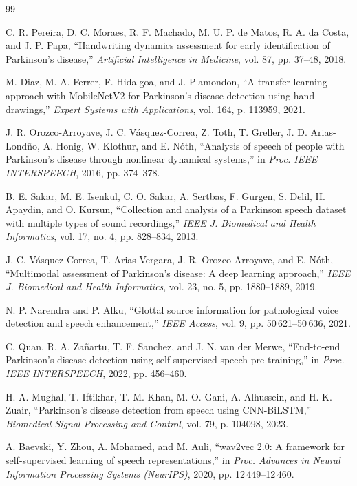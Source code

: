 \documentclass[10pt,conference,letterpaper]{IEEEtran}
\begin{document}
\begin{thebibliography}{99}

 C. R. Pereira, D. C. Moraes, R. F. Machado, M. U. P. de Matos, R. A. da Costa, and J. P. Papa, ``Handwriting dynamics assessment for early identification of {P}arkinson's disease,'' \textit{Artificial Intelligence in Medicine}, vol. 87, pp. 37--48, 2018.

 M. Diaz, M. A. Ferrer, F. Hidalgoa, and J. Plamondon, ``A transfer learning approach with {MobileNetV2} for {P}arkinson's disease detection using hand drawings,'' \textit{Expert Systems with Applications}, vol. 164, p. 113959, 2021.

 J. R. Orozco-Arroyave, J. C. V\'{a}squez-Correa, Z. Toth, T. Greller, J. D. Arias-Lond\~{n}o, A. Honig, W. Klothur, and E. N\'{o}th, ``Analysis of speech of people with {P}arkinson's disease through nonlinear dynamical systems,'' in \textit{Proc. IEEE INTERSPEECH}, 2016, pp. 374--378.

 B. E. Sakar, M. E. Isenkul, C. O. Sakar, A. Sertbas, F. Gurgen, S. Delil, H. Apaydin, and O. Kursun, ``Collection and analysis of a {P}arkinson speech dataset with multiple types of sound recordings,'' \textit{IEEE J. Biomedical and Health Informatics}, vol. 17, no. 4, pp. 828--834, 2013.

 J. C. V\'{a}squez-Correa, T. Arias-Vergara, J. R. Orozco-Arroyave, and E. N\'{o}th, ``Multimodal assessment of {P}arkinson's disease: A deep learning approach,'' \textit{IEEE J. Biomedical and Health Informatics}, vol. 23, no. 5, pp. 1880--1889, 2019.

 N. P. Narendra and P. Alku, ``Glottal source information for pathological voice detection and speech enhancement,'' \textit{IEEE Access}, vol. 9, pp. 50\,621--50\,636, 2021.

 C. Quan, R. A. Za\~{n}artu, T. F. Sanchez, and J. N. van der Merwe, ``End-to-end {P}arkinson's disease detection using self-supervised speech pre-training,'' in \textit{Proc. IEEE INTERSPEECH}, 2022, pp. 456--460.

 H. A. Mughal, T. Iftikhar, T. M. Khan, M. O. Gani, A. Alhussein, and H. K. Zuair, ``{P}arkinson's disease detection from speech using {CNN}-{BiLSTM},'' \textit{Biomedical Signal Processing and Control}, vol. 79, p. 104098, 2023.

 A. Baevski, Y. Zhou, A. Mohamed, and M. Auli, ``wav2vec 2.0: A framework for self-supervised learning of speech representations,'' in \textit{Proc. Advances in Neural Information Processing Systems (NeurIPS)}, 2020, pp. 12\,449--12\,460.


\end{thebibliography}
\end{document}
